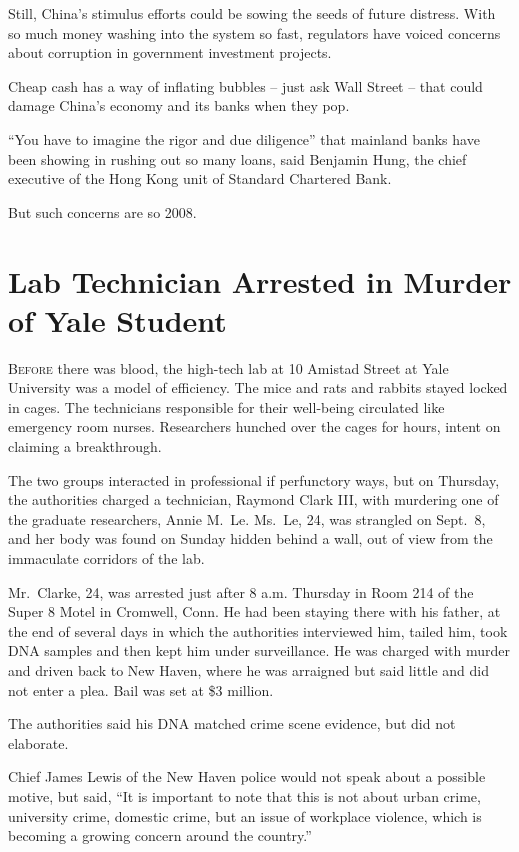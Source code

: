 ﻿\documentclass[12pt]{article}
\begin{document}
Still, China's stimulus efforts could be sowing the seeds of future distress. With so much money
washing into the system so fast, regulators have voiced concerns about corruption in government
investment projects.

Cheap cash has a way of inflating bubbles -- just ask Wall Street -- that could damage China's
economy and its banks when they pop.

``You have to imagine the rigor\cite{rigor} and due diligence'' that mainland banks have been
showing in rushing out so many loans, said Benjamin Hung, the chief executive of the Hong Kong unit
of Standard Chartered Bank.

But such concerns are so 2008.

\section{Lab Technician Arrested in Murder of Yale Student}

\lettrine{B}{efore} there was blood, the high-tech lab at 10 Amistad Street at Yale University was a
model of efficiency. The mice and rats and rabbits stayed locked in cages. The technicians
responsible for their well-being circulated like emergency room nurses. Researchers hunched over the
cages for hours, intent on claiming a breakthrough.

The two groups interacted in professional if perfunctory\cite{perfunctory} ways, but on Thursday,
the authorities charged a technician, Raymond Clark III, with murdering one of the graduate
researchers, Annie M.~Le. Ms.~Le, 24, was strangled on Sept.~8, and her body was found on Sunday
hidden behind a wall, out of view from the immaculate\cite{immaculate} corridors of the lab.

Mr.~Clarke, 24, was arrested just after 8 a.m. Thursday in Room 214 of the Super 8 Motel in
Cromwell, Conn. He had been staying there with his father, at the end of several days in which the
authorities interviewed him, tailed him, took DNA samples and then kept him under surveillance. He
was charged with murder and driven back to New Haven, where he was arraigned but said little and did
not enter a plea. Bail was set at \$3 million.

The authorities said his DNA matched crime scene evidence, but did not elaborate.

Chief James Lewis of the New Haven police would not speak about a possible motive, but said, ``It is
important to note that this is not about urban crime, university crime, domestic crime, but an issue
of workplace violence, which is becoming a growing concern around the country.''
\end{document}
